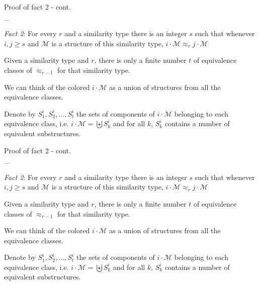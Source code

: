 \documentclass[landscape,a4]{myslides}
\begin{document}
\begin{slide}
\begin{center}
{%
\color{blue}
Proof of fact 2 - cont.
}
\\
\_\hrulefill
\end{center}
\small
\emph{Fact 2}: For every $r$ and a similarity type there is an integer $s$ such that whenever $i,j\ge s$ and $\mathcal{M}$ is a structure of this similarity type, $i\cdot\mathcal{M}\approx_rj\cdot\mathcal{M}$

Given a similarity type and $r$, there is only a finite number $t$ of equivalence classes of $\approx_{r-1}$ for that similarity type.

We can think of the colored $i\cdot \mathcal{M}$ as a union of structures from all the equivalence classes.

Denote by $S_1^i,S_2^i,\dots,S_t^i$ the sets of components of $i\cdot \mathcal{M}$ belonging to each equivalence class, 
i.e. $i\cdot \mathcal{M} = \biguplus S_k^i$ and for all $k$, $S_k^i$ contains a number of equivalent substructures.

\end{slide}

\begin{slide}
\begin{center}
{%
\color{blue}
Proof of fact 2 - cont.
}
\\
\_\hrulefill
\end{center}
\small
\emph{Fact 2}: For every $r$ and a similarity type there is an integer $s$ such that whenever $i,j\ge s$ and $\mathcal{M}$ is a structure of this similarity type, $i\cdot\mathcal{M}\approx_rj\cdot\mathcal{M}$

Given a similarity type and $r$, there is only a finite number $t$ of equivalence classes of $\approx_{r-1}$ for that similarity type.

We can think of the colored $i\cdot \mathcal{M}$ as a union of structures from all the equivalence classes.

Denote by $S_1^i,S_2^i,\dots,S_t^i$ the sets of components of $i\cdot \mathcal{M}$ belonging to each equivalence class, 
i.e. $i\cdot \mathcal{M} = \biguplus S_k^i$ and for all $k$, $S_k^i$ contains a number of equivalent substructures.

\end{slide}
\end{document}
